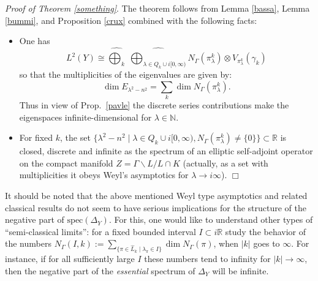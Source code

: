 \documentclass[10]{amsart}
\theoremstyle{remark}
\theoremstyle{definition}
\numberwithin{equation}{section}
\newcommand{\N}{\mathbb{N}}           %
\newcommand{\spec}{{\mathrm{spec}}}
\newcommand{\vol}{{\mathrm{vol}}}
\newcommand{\be}{\begin{equation}}
\newcommand{\beu}{\begin{equation*}}
\newcommand{\defn}{{:=}}
\begin{document}
{{\em Proof of Theorem \ref{something}}.
The theorem follows from Lemma \ref{bassa}, Lemma \ref{bummi}, and Proposition \ref{crux} combined with the following facts:
%
\begin{itemize}
\item One has
%
\beu
L^2(Y)\cong\widehat{\bigoplus_{k}}\;\widehat{\bigoplus_{\lambda\in Q_{k}\cup i\lbrack 0,\infty)}}N_\Gamma(\pi_{\lambda}^{k})\otimes V_{\pi_{\lambda}^{k}}(\gamma_k)
\end{equation*}
%
so that the multiplicities of the eigenvalues are given by:
%
\be\label{klumpfuss}
\dim E_{\lambda^{2}-n^{2}}=\sum_{k}\dim N_\Gamma(\pi_{\lambda}^{k}).
\end{equation}
Thus in view of Prop.~\ref{pavle} the discrete series contributions make the eigenspaces infinite-dimensional for $\lambda\in\N$.
%
\item For fixed $k$, the set $\big\{\lambda^2-n^2\mid \lambda\in Q_{k}\cup i\lbrack 0,\infty), N_\Gamma(\pi_{\lambda}^{k})\ne\{0\}\big\}\subset\mathbb{R}$ is closed, discrete and infinite as the spectrum 
of an elliptic self-adjoint operator on the compact manifold $Z=\Gamma\backslash L/L\cap K$ (actually, as a set with multiplicities it obeys Weyl's asymptotics for $\lambda\to i\infty$).
\hfill$\Box$
\end{itemize}
%

It should be noted that the above mentioned Weyl type asymptotics and related classical results do not seem to have serious implications for the structure 
of the negative part of $\spec(\Delta_Y)$. For this, one would like to understand other types of ``semi-classical limits'':
for a fixed bounded interval $I\subset i\mathbb{R}$ study the behavior of the numbers
$N_\Gamma(I,k)\defn\sum_{\{\pi\in \widehat L_k\mid \lambda_\pi\in I\} }\dim N_\Gamma(\pi)$, when $|k|$ goes to $\infty$. For instance, if for all sufficiently large $I$ these numbers
tend to infinity for $|k|\to\infty$, then the negative part of the {\em essential} spectrum of $\Delta_Y$ will be infinite.

}
\end{document}
